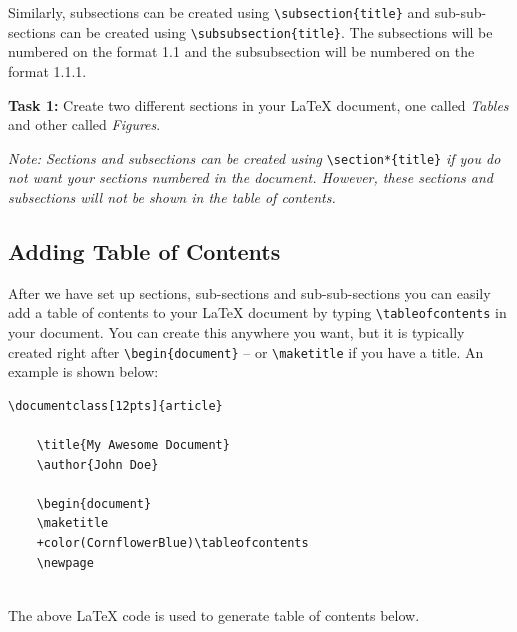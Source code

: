 \documentclass[12pts]{article}
\begin{document}
	Similarly, subsections can be created using \verb|\subsection{title}| and sub-sub-sections can be created using \verb|\subsubsection{title}|. The subsections will be numbered on the format 1.1 and the subsubsection will be numbered on the format 1.1.1.
	
	\textcolor{BurntOrange}{\textbf{Task 1:}} Create two different sections in your {\LaTeX} document, one called \emph{Tables} and other called \emph{Figures}.
	
	\textit{Note: Sections and subsections can be created using} \verb|\section*{title}| \textit{if you do not want your sections numbered in the document. However, these sections and subsections will not be shown in the table of contents.}
	
	\subsection{Adding Table of Contents}
	
	After we have set up sections, sub-sections and sub-sub-sections you can easily add a table of contents to your {\LaTeX} document by typing \verb|\tableofcontents| in your document. You can create this anywhere you want, but it is typically created right after \verb|\begin{document}| -- or \verb|\maketitle| if you have a title.  An example is shown below:
	
	\begin{minipage}{\textwidth}
	\begin{Verbatim}[commandchars=+\(\)]
	\documentclass[12pts]{article}
	
	\title{My Awesome Document}
	\author{John Doe}
	
	\begin{document}
	\maketitle
	+color(CornflowerBlue)\tableofcontents
	\newpage
	
	\end{Verbatim}
	
\end{minipage}
	The above {\LaTeX} code is used to generate table of contents below.
	
\end{document}
